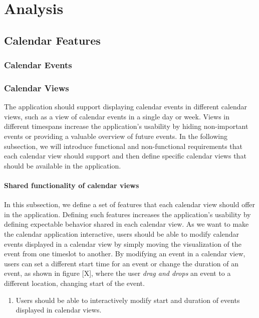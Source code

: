 \chapter{Analysis}

\section{Calendar Features}

\subsection*{Calendar Events}

\subsection*{Calendar Views}
The application should support displaying calendar events in different calendar views, such as a view of calendar events in a single day or week. Views in different timespans increase the application's usability by hiding non-important events or providing a valuable overview of future events.
In the following subsection, we will introduce functional and non-functional requirements that each calendar view should support and then define specific calendar views that should be available in the application.

\subsubsection*{Shared functionality of calendar views}
In this subsection, we define a set of features that each calendar view should offer in the application. Defining such features increases the application's usability by defining expectable behavior shared in each calendar view.
As we want to make the calendar application interactive, users should be able to modify calendar events displayed in a calendar view by simply moving the visualization of the event from one timeslot to another. By modifying an event in a calendar view, users can set a different start time for an event or change the duration of an event, as shown in figure [X], where the user \textit{drag and drops} an event to a different location, changing start of the event.

\begin{enumerate}[label=\color{reqcolor}\textbf{R{\arabic*}}]
    \item \label{app:req:dragdrop} Users should be able to interactively modify start and duration of events displayed in calendar views.
\end{enumerate}

